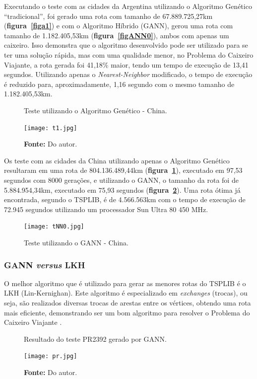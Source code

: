 \documentclass[12pt,openright,a4paper,oneside]{tcc}
\begin{document}
		Executando o teste com as cidades da Argentina utilizando o Algoritmo Genético ``tradicional'', foi gerado uma rota com tamanho de 67.889.725,27km (\textbf{figura~\ref{figa1}}) e com o Algoritmo Híbrido (GANN), gerou uma rota com tamanho de 1.182.405,53km (\textbf{figura~\ref{figANN0}}), ambos com apenas um caixeiro. Isso demonstra que o algoritmo desenvolvido pode ser utilizado para se ter uma solução rápida, mas com uma qualidade menor, no Problema do Caixeiro Viajante, a rota gerada foi 41,18\% maior, tendo um tempo de execução de 13,41 segundos. Utilizando apenas o \textit{Nearest-Neighbor} modificado, o tempo de execução é reduzido para, aproximadamente, 1,16 segundo com o mesmo tamanho de 1.182.405,53km.

   		\begin{figure}[h]
			\centering
            \caption{Teste utilizando o Algoritmo Genético - China.}
	        \texttt{[image: t1.jpg]}
	        \caption*{\textbf{Fonte:} Do autor.}
	        \label{figt1}
   		\end{figure}

        Os teste com as cidades da China utilizando apenas o Algoritmo Genético resultaram em uma rota de 804.136.489,44km (\textbf{figura~\ref{figt1}}), executado em 97,53 segundos com 8000 gerações, e utilizando o GANN, o tamanho da rota foi de 5.884.954,34km, executado em 75,93 segundos (\textbf{figura~\ref{figtNN0}}). Uma rota ótima já encontrada, segundo o TSPLIB, é de 4.566.563km com o tempo de execução de 72.945 segundos utilizando um processador Sun Ultra 80 450 MHz.
        \begin{figure}[h]
            \centering
            \caption{Teste utilizando o GANN - China.}
            \texttt{[image: tNN0.jpg]}
            \label{figtNN0}
        \end{figure}

        
   		\subsubsection{GANN \textit{versus} LKH}

		O melhor algoritmo que é utilizado para gerar as menores rotas do TSPLIB é o LKH (Lin-Kernighan). Este algoritmo é especializado em \textit{exchanges} (trocas), ou seja, são realizados diversas trocas de arestas entre os vértices, obtendo uma rota mais eficiente, demonstrando ser um bom algoritmo para resolver o Problema do Caixeiro Viajante \cite{LKH}. 

		\begin{figure}[h]
			\centering
            \caption{Resultado do teste PR2392 gerado por GANN.}
		    \texttt{[image: pr.jpg]}
		    \caption*{\textbf{Fonte:} Do autor.}
		    \label{figpa}
		\end{figure}
\end{document}
